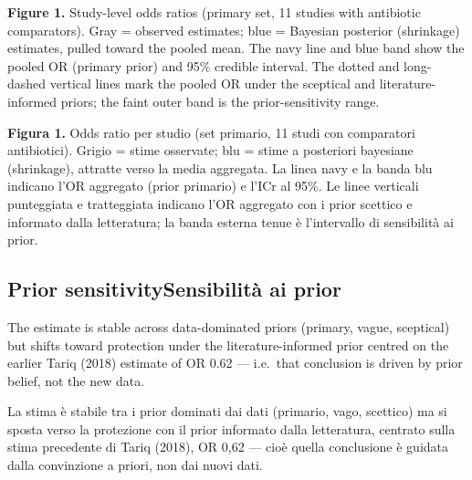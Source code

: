 \documentclass[
  letterpaper,
  DIV=11,
  numbers=noendperiod]{scrartcl}
\begin{document}
\textbf{Figure 1.} Study-level odds ratios (primary set, 11 studies with
antibiotic comparators). Gray = observed estimates; blue = Bayesian
posterior (shrinkage) estimates, pulled toward the pooled mean. The navy
line and blue band show the pooled OR (primary prior) and 95\% credible
interval. The dotted and long-dashed vertical lines mark the pooled OR
under the sceptical and literature-informed priors; the faint outer band
is the prior-sensitivity range.

\textbf{Figura 1.} Odds ratio per studio (set primario, 11 studi con
comparatori antibiotici). Grigio = stime osservate; blu = stime a
posteriori bayesiane (shrinkage), attratte verso la media aggregata. La
linea navy e la banda blu indicano l'OR aggregato (prior primario) e
l'ICr al 95\%. Le linee verticali punteggiata e tratteggiata indicano
l'OR aggregato con i prior scettico e informato dalla letteratura; la
banda esterna tenue è l'intervallo di sensibilità ai prior.

\subsection{\texorpdfstring{{Prior sensitivity}{Sensibilità ai
prior}}{Prior sensitivitySensibilità ai prior}}\label{prior-sensitivitysensibilituxe0-ai-prior}

The estimate is stable across data-dominated priors (primary, vague,
sceptical) but shifts toward protection under the literature-informed
prior centred on the earlier Tariq (2018) estimate of OR 0.62 ---
i.e.~that conclusion is driven by prior belief, not the new data.

La stima è stabile tra i prior dominati dai dati (primario, vago,
scettico) ma si sposta verso la protezione con il prior informato dalla
letteratura, centrato sulla stima precedente di Tariq (2018), OR 0,62
--- cioè quella conclusione è guidata dalla convinzione a priori, non
dai nuovi dati.
\end{document}
